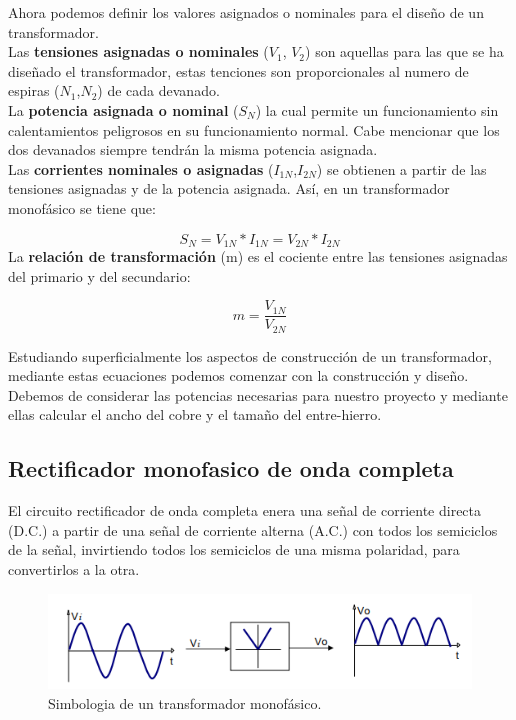 Ahora podemos definir los valores asignados o nominales para el diseño de un transformador.\\

Las \textbf{tensiones asignadas o nominales} ($V_{1}$, $V_{2}$) son aquellas para las que se ha diseñado el transformador, estas tenciones son proporcionales al numero de espiras ($N_{1}$,$N_{2}$) de cada devanado.\\

La \textbf{potencia asignada o nominal} ($S_{N}$) la cual permite un funcionamiento sin calentamientos peligrosos en su funcionamiento normal. Cabe mencionar que los dos devanados siempre tendrán la misma potencia asignada.\\

Las \textbf{corrientes nominales o asignadas} ($I_{1N}$,$I_{2N}$) se obtienen a partir de las tensiones asignadas y de la potencia asignada. Así, en un transformador monofásico se tiene que:

\begin{equation}\label{eq:ej}
S_{N}=V_{1N}*I_{1N}=V_{2N}*I_{2N}
\end{equation}
La \textbf{relación de transformación} (m) es el cociente entre las tensiones asignadas del primario y del secundario: 

\begin{equation}\label{eq:ej}
m=\dfrac{V_{1N}}{V_{2N}}
\end{equation}

Estudiando superficialmente los aspectos de construcción de un transformador, mediante estas ecuaciones podemos comenzar con la construcción y diseño. Debemos de considerar las potencias necesarias para nuestro proyecto y mediante ellas calcular el ancho del cobre y el tamaño del entre-hierro.\cite{transformador}

\subsection{Rectificador monofasico de onda completa}

El circuito rectificador de onda completa enera una señal de corriente directa (D.C.) a partir de una señal de corriente alterna
(A.C.) con todos los semiciclos de la señal, invirtiendo todos los semiciclos de una misma polaridad, para convertirlos a la otra. 

\begin{figure}[H]
\centering
\includegraphics[width=12cm]{capitulo3/figs/puente.png}
\caption{ Simbologia de un transformador monofásico.}
\end{figure}

